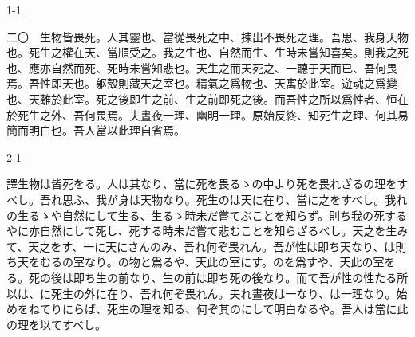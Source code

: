 \documentclass[tate,paper=b6j,jafontsize=9pt]{jlreq}
\begin{document}
\begin{azconvIndented}{1\zw}{-1\zw}

二〇　生物皆畏死。人其靈也、當從畏死之中、揀出不畏死之理。吾思、我身天物也。死生之權在天、當順受之。我之生也、自然而生、生時未嘗知\azconvKunten{\azconvIR}喜矣。則我之死也、應亦自然而死、死時未嘗知\azconvKunten{\azconvIR}悲也。天生之而天死之、一聽于天而已、吾何畏焉。吾性即天也。躯殼則藏天之室也。精氣之爲物也、天寓於此室。遊魂之爲變也、天離於此室。死之後即生之前、生之前即死之後。而吾性之所以爲\azconvKunten{\azconvIR}性者、恒在於死生之外、吾何畏焉。夫晝夜一理、幽明一理。原始反終、知死生之理、何其易簡而明白也。吾人當以此理自省焉。

\end{azconvIndented}
\begin{azconvIndented}{2\zw}{-1\zw}

譯生物は皆死をる。人は其なり、當に死を畏るゝの中より死を畏れざるの理をすべし。吾れ思ふ、我が身は天物なり。死生のは天に在り、當に之をすべし。我れの生るゝや自然にして生る、生るゝ時未だ嘗てぶことを知らず。則ち我の死するやに亦自然にして死し、死する時未だ嘗て悲むことを知らざるべし。天之を生みて、天之をす、一に天にさんのみ、吾れ何ぞ畏れん。吾が性は即ち天なり、は則ち天をむるの室なり。の物と爲るや、天此の室にす。のを爲すや、天此の室をる。死の後は即ち生の前なり、生の前は即ち死の後なり。而て吾が性の性たる所以は、に死生の外に在り、吾れ何ぞ畏れん。夫れ晝夜は一なり、は一理なり。始めをねてりにらば、死生の理を知る、何ぞ其のにして明白なるや。吾人は當に此の理を以てすべし。

\end{azconvIndented}
\end{document}
